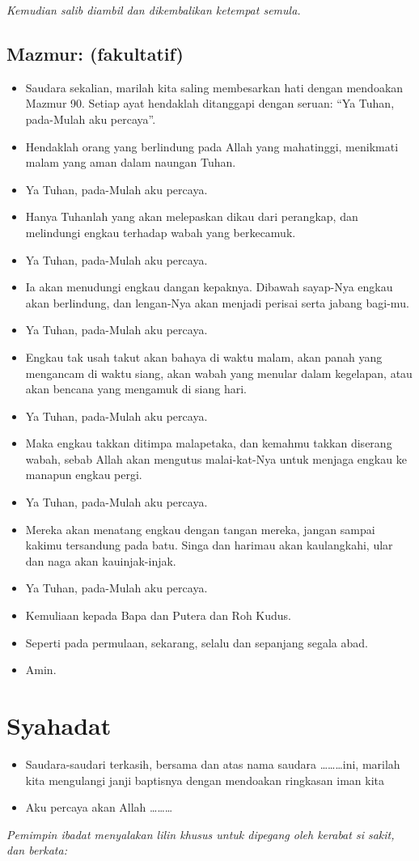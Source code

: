 \documentclass[10pt,a5paper,fancyhdr]{memoir}
\newcommand{\BU}[1]{\begin{itemize}\itemsep0pt \item[U:] #1 \end{itemize}}
\newcommand{\BPU}[1]{\begin{itemize}\itemsep0pt \item[P+U:] #1 \end{itemize}}
\newcommand{\BP}[1]{\begin{itemize}\itemsep0pt \item[P:] #1 \end{itemize}}
\newcommand{\nama}{\ldots\ldots\ldots}
\begin{document}
\textit{Kemudian salib diambil dan dikembalikan ketempat semula.} 

\subsection*{Mazmur: (fakultatif)} 


\BP{Saudara sekalian, marilah kita saling membesarkan hati dengan mendoakan Mazmur 90. Setiap ayat hendaklah ditanggapi dengan seruan: “Ya Tuhan, pada-Mulah aku percaya”.} 
\BP{Hendaklah orang yang berlindung pada Allah yang mahatinggi, menikmati malam yang aman dalam
naungan Tuhan.} 
\BU{Ya Tuhan, pada-Mulah aku percaya. }
\BP{Hanya Tuhanlah yang akan melepaskan dikau dari perangkap, dan melindungi engkau terhadap wabah
yang berkecamuk.} 
\BU{Ya Tuhan, pada-Mulah aku percaya. }
\BP{Ia akan menudungi engkau dangan kepaknya. Dibawah sayap-Nya engkau akan berlindung, dan
lengan-Nya akan menjadi perisai serta jabang bagi-mu. }
\BU{Ya Tuhan, pada-Mulah aku percaya. }
\BP{Engkau tak usah takut akan bahaya di waktu malam, akan panah yang mengancam di waktu siang, akan
wabah yang menular dalam kegelapan, atau akan bencana yang mengamuk di siang hari. }
\BU{Ya Tuhan, pada-Mulah aku percaya. }
\BP{Maka engkau takkan ditimpa malapetaka, dan kemahmu takkan diserang wabah, sebab Allah akan
mengutus malai-kat-Nya untuk menjaga engkau ke manapun engkau pergi.} 
\BU{Ya Tuhan, pada-Mulah aku percaya. }
\BP{Mereka akan menatang engkau dengan tangan mereka, jangan sampai kakimu tersandung pada batu.
Singa dan harimau akan kaulangkahi, ular dan naga akan kauinjak-injak.} 
\BU{Ya Tuhan, pada-Mulah aku percaya. }
\BP{Kemuliaan kepada Bapa dan Putera dan Roh Kudus. }
\BU{Seperti pada permulaan, sekarang, selalu dan sepanjang segala abad. }
\BPU{Amin.} 

\section*{Syahadat}

\BP{Saudara-saudari terkasih, bersama dan atas nama saudara 
\nama ini, marilah kita mengulangi janji baptisnya dengan 
mendoakan ringkasan iman kita }
\BU{Aku percaya akan Allah \ldots\ldots\ldots} 

\textit{Pemimpin ibadat menyalakan lilin khusus untuk dipegang oleh 
kerabat si sakit, dan berkata:} 
\end{document}
